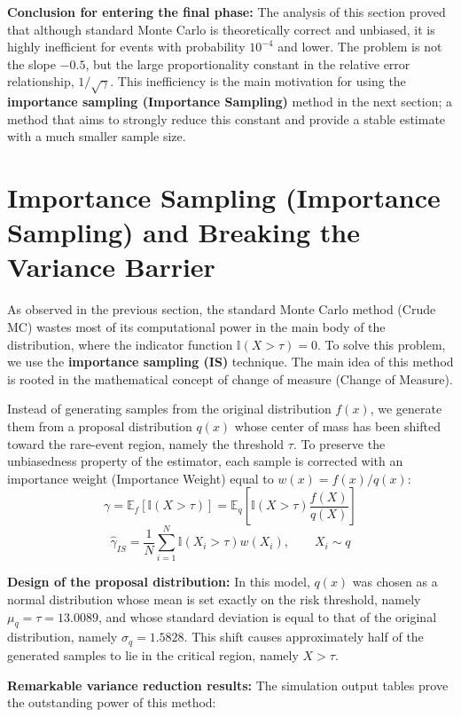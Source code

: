 \documentclass[12pt,a4paper]{article}
\begin{document}
	\textbf{Conclusion for entering the final phase:} The analysis of this section proved that although standard Monte Carlo is theoretically correct and unbiased, it is highly inefficient for events with probability $10^{-4}$ and lower. The problem is not the slope $ -0.5$, but the large proportionality constant in the relative error relationship, $1/\sqrt{\gamma}$. This inefficiency is the main motivation for using the \textbf{importance sampling (Importance Sampling)} method in the next section; a method that aims to strongly reduce this constant and provide a stable estimate with a much smaller sample size.
	
	
	\section{Importance Sampling (Importance Sampling) and Breaking the Variance Barrier}
	
	As observed in the previous section, the standard Monte Carlo method (Crude MC) wastes most of its computational power in the main body of the distribution, where the indicator function $\mathbb{I}(X > \tau) = 0$. To solve this problem, we use the \textbf{importance sampling (IS)} technique. The main idea of this method is rooted in the mathematical concept of change of measure (Change of Measure).
	
	Instead of generating samples from the original distribution $f(x)$, we generate them from a proposal distribution $q(x)$ whose center of mass has been shifted toward the rare-event region, namely the threshold $\tau$. To preserve the unbiasedness property of the estimator, each sample is corrected with an importance weight (Importance Weight) equal to $w(x) = f(x)/q(x)$:
	\[
	\gamma =
	\mathbb{E}_f[\mathbb{I}(X>\tau)]
	=
	\mathbb{E}_q
	\left[
	\mathbb{I}(X>\tau)
	\frac{f(X)}{q(X)}
	\right]
	\]
	\[
	\hat{\gamma}_{IS} =
	\frac{1}{N}
	\sum_{i=1}^{N}
	\mathbb{I}(X_i > \tau) w(X_i),
	\qquad
	X_i \sim q
	\]
	
	\textbf{Design of the proposal distribution:}
	In this model, $q(x)$ was chosen as a normal distribution whose mean is set exactly on the risk threshold, namely $\mu_q = \tau = 13.0089$, and whose standard deviation is equal to that of the original distribution, namely $\sigma_q = 1.5828$. This shift causes approximately half of the generated samples to lie in the critical region, namely $X > \tau$.
	
	\textbf{Remarkable variance reduction results:}
	The simulation output tables prove the outstanding power of this method:
	
\end{document}
